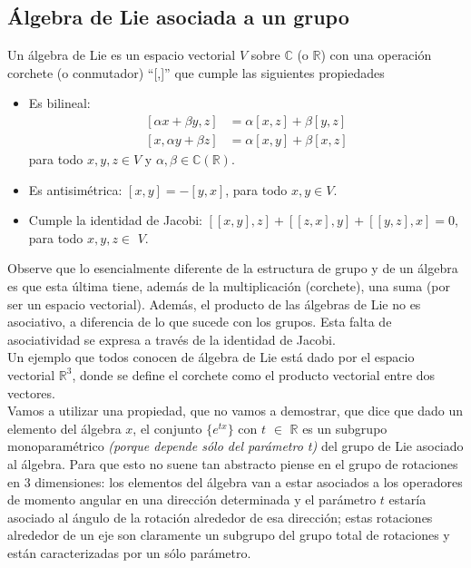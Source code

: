 \subsection{Álgebra de Lie asociada a un grupo} \label{Álgebra de Lie asociada a un grupo}
\vspace{0.3cm}
\begin{definition}
Un álgebra de Lie es un espacio vectorial $V$ sobre $\mathbb{C}$ (o $\mathbb{R}$) con una operación corchete (o conmutador) ``[,]'' que cumple las siguientes propiedades
\begin{itemize}
    \item[(a)] Es bilineal:
$$
\begin{aligned}
{[\alpha x+\beta y, z] } &=\alpha[x, z]+\beta[y, z] \\
{[x, \alpha y+\beta z] } &=\alpha[x, y]+\beta[x, z]
\end{aligned}
$$
para todo $x, y, z \in V$ y $\alpha, \beta \in \mathbb{C}(\mathbb{R})$.
    \item[(b)] Es antisimétrica: $[x, y]=-[y, x]$, para todo $x, y \in V$.
    \item[(c)] Cumple la identidad de Jacobi: $[[x, y], z]+[[z, x], y]+[[y, z], x]=0$, para todo $x, y, z \in$ $V$.
\end{itemize}
\end{definition}
\vspace{0.2cm}
Observe que lo esencialmente diferente de la estructura de grupo y de un álgebra es que esta última tiene, además de la multiplicación (corchete), una suma (por ser un espacio vectorial). Además, el producto de las álgebras de Lie no es asociativo, a diferencia de lo que sucede con los grupos. Esta falta de asociatividad se expresa a través de la identidad de Jacobi.\\

Un ejemplo que todos conocen de álgebra de Lie está dado por el espacio vectorial $\mathbb{R}^{3}$, donde se define el corchete como el producto vectorial entre dos vectores.\\

Vamos a utilizar una propiedad, que no vamos a demostrar, que dice que dado un elemento del álgebra $x$, el conjunto $\{e^{tx}\}$ con $t$ $\in$ $\mathbb{R}$ es un subgrupo monoparamétrico \emph{(porque depende sólo del parámetro t)} del grupo de Lie asociado al álgebra. Para que esto no suene tan abstracto piense en el grupo de rotaciones en $3$ dimensiones: los elementos del álgebra van a estar asociados a los operadores de momento angular en una dirección determinada y el parámetro $t$ estaría asociado al ángulo de la rotación alrededor de esa dirección; estas rotaciones alrededor de un eje son claramente un subgrupo del grupo total de rotaciones y están caracterizadas por un sólo parámetro.\\


